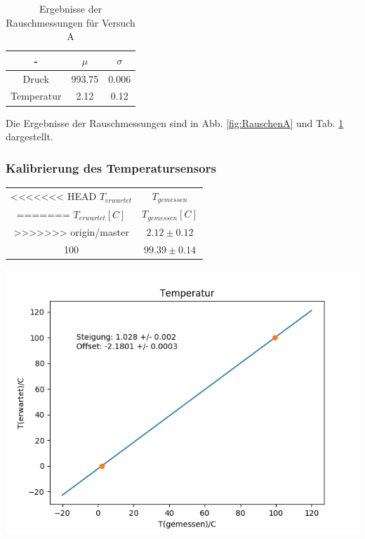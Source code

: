 \documentclass[12pt,a4paper]{article}
\begin{document}
\begin{table}
\begin{center}
\begin{tabular}{|c|c|c|}
\hline
- & $\mu$ & $\sigma$\\
\hline
Druck & 993.75 & 0.006\\
\hline
Temperatur & 2.12 & 0.12\\
\hline
\end{tabular}
\caption[Tab. Rauschen A]{Ergebnisse der Rauschmessungen für Versuch A}
\label{tab:RauschenA}
\end{center}
\end{table}

Die Ergebnisse der Rauschmessungen sind in Abb. \ref{fig:RauschenA} und Tab. \ref{tab:RauschenA} dargestellt.

\subsubsection{Kalibrierung des Temperatursensors}
\begin{tabular}{|c|c|}
\hline 
<<<<<<< HEAD
$T_{erwartet}$ & $T_{gemessen}$ \\ 
=======
$T_{erwartet}[C]$ & $T_{gemessen}[C]$ \\ 
>>>>>>> origin/master
\hline 
0 & $2.12\pm0.12$ \\ 
\hline 
100 & $99.39\pm0.14$ \\ 
\hline 
\end{tabular} 

\includegraphics[width=\linewidth]{Bilder/KalibrationA}\\
\end{document}
